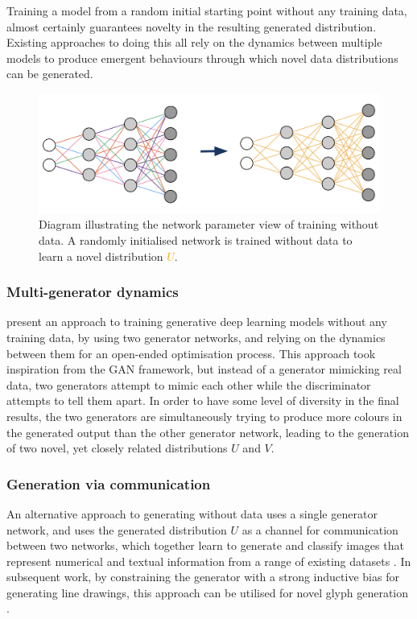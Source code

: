 Training a model from a random initial starting point without any training data, almost certainly guarantees novelty in the resulting generated distribution. 
Existing approaches to doing this all rely on the dynamics between multiple models to produce emergent behaviours through which novel data distributions can be generated. 

\begin{figure}[!htbp]
    \centering
    \includegraphics[width=1\textwidth]{figures/c6_active_div/diagrams/training_without_data.png}
    \caption[Diagram illustrating the network parameter view of training without data.]{Diagram illustrating the network parameter view of training without data. A randomly initialised network is trained without data to learn a novel distribution \textcolor{orange}{$U$}.}
  \label{fig:c6:no-data}
  \end{figure}

\subsubsection{Multi-generator dynamics} \citet{broad2019searching} present an approach to training generative deep learning models without any training data, by using two generator networks, and relying on the dynamics between them for an open-ended optimisation process. 
This approach took inspiration from the GAN framework, but instead of a generator mimicking real data, two generators attempt to mimic each other while the discriminator attempts to tell them apart. 
In order to have some level of diversity in the final results, the two generators are simultaneously trying to produce more colours in the generated output than the other generator network, leading to the generation of two novel, yet closely related distributions $U$ and $V$.

\subsubsection{Generation via communication} An alternative approach to generating without data uses a single generator network, and uses the generated distribution $U$ as a channel for communication between two networks, which together learn to generate and classify images that represent numerical and textual information from a range of existing datasets \citep{simon2019dimensions}. 
In subsequent work, by constraining the generator with a strong inductive bias for generating line drawings, this approach can be utilised for novel glyph generation \citep{park2020generating}.


